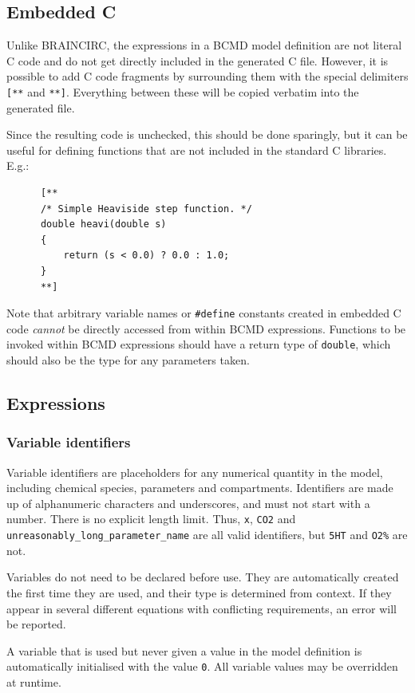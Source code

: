 \documentclass[a4paper,11pt]{article}
\begin{document}
\subsection{Embedded C}\label{embeds}
Unlike BRAINCIRC, the expressions in a BCMD model definition are not literal C code and do not get directly included in the generated C file. However, it is possible to add C code fragments by surrounding them with the special delimiters \texttt{[**} and \texttt{**]}. Everything between these will be copied verbatim into the generated file.

Since the resulting code is unchecked, this should be done sparingly, but it can be useful for defining functions that are not included in the standard C libraries. E.g.:
\begin{verbatim}
      [**
      /* Simple Heaviside step function. */
      double heavi(double s)
      {
          return (s < 0.0) ? 0.0 : 1.0;
      }
      **]
\end{verbatim}
Note that arbitrary variable names or \texttt{\#define} constants created in embedded C code \textit{cannot} be directly accessed from within BCMD expressions. Functions to be invoked within BCMD expressions should have a return type of \texttt{double}, which should also be the type for any parameters taken.

\subsection{Expressions}

\subsubsection{Variable identifiers}\label{vars}
Variable identifiers are placeholders for any numerical quantity in the model, including chemical species, parameters and compartments. Identifiers are made up of alphanumeric characters and underscores, and must not start with a number. There is no explicit length limit. Thus, \texttt{x}, \texttt{CO2} and \texttt{unreasonably\_long\_parameter\_name} are all valid identifiers, but \texttt{5HT} and \texttt{O2\%} are not.

Variables do not need to be declared before use. They are automatically created the first time they are used, and their type is determined from context. If they appear in several different equations with conflicting requirements, an error will be reported.

A variable that is used but never given a value in the model definition is automatically initialised with the value \texttt{0}. All variable values may be overridden at runtime.
\end{document}
